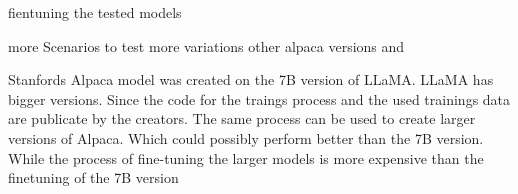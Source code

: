 fientuning the tested models


more Scenarios to test more variations 
other alpaca versions and 

Stanfords Alpaca model was created on the 7B version of LLaMA. LLaMA has bigger versions.  Since the code for the traings process and the used trainings data are publicate by the creators. The same process can be used to create larger versions of Alpaca. Which could possibly perform better than the 7B version. While the process of fine-tuning the larger models is more expensive than the finetuning of the 7B version 


